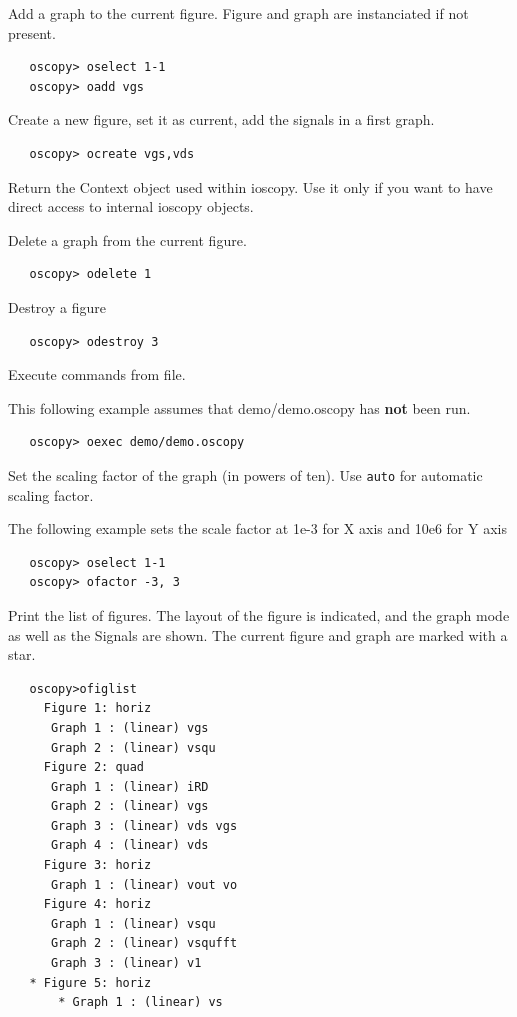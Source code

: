 \documentclass[a4paper,11pt]{report}
\begin{document}
   Add a graph to the current figure. Figure and graph are instanciated if not present.

\begin{lstlisting}
   oscopy> oselect 1-1
   oscopy> oadd vgs
\end{lstlisting}

   Create a new figure, set it as current, add the signals in a first graph.

\begin{lstlisting}
   oscopy> ocreate vgs,vds
\end{lstlisting}

   Return the Context object used within ioscopy.
 Use it only if you want to have direct access to internal ioscopy objects.

   Delete a graph from the current figure.

\begin{lstlisting}
   oscopy> odelete 1
\end{lstlisting}

   Destroy a figure

\begin{lstlisting}
   oscopy> odestroy 3
\end{lstlisting}

   Execute commands from file.

   This following example assumes that demo/demo.oscopy has \textbf{not} been run.

\begin{lstlisting}
   oscopy> oexec demo/demo.oscopy
\end{lstlisting}

   Set the scaling factor of the graph (in powers of ten). Use \texttt{auto} for automatic scaling factor.

\noindent   The following example sets the scale factor at 1e-3 for X axis and 10e6 for Y axis
\begin{lstlisting}
   oscopy> oselect 1-1
   oscopy> ofactor -3, 3
\end{lstlisting}

   Print the list of figures. The layout of the figure is indicated, and the graph mode as well as the Signals are shown. The current figure and graph are marked with a star.
\begin{lstlisting}
   oscopy>ofiglist
     Figure 1: horiz
      Graph 1 : (linear) vgs
      Graph 2 : (linear) vsqu
     Figure 2: quad
      Graph 1 : (linear) iRD
      Graph 2 : (linear) vgs
      Graph 3 : (linear) vds vgs
      Graph 4 : (linear) vds
     Figure 3: horiz
      Graph 1 : (linear) vout vo
     Figure 4: horiz
      Graph 1 : (linear) vsqu
      Graph 2 : (linear) vsqufft
      Graph 3 : (linear) v1
   * Figure 5: horiz
       * Graph 1 : (linear) vs
\end{lstlisting}
\end{document}
